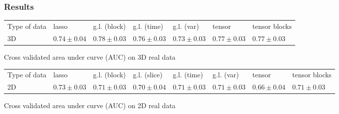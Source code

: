 \documentclass{beamer}
\begin{document}
\begin{frame}
    \frametitle{Results}
    \begin{table}[H]
        \centering
        \label{tab:result_real}
        \renewcommand{\arraystretch}{1.2} 
        \begin{adjustbox}{center}
        \begin{tabular}{|>{\centering\arraybackslash}m{1.4cm}|>{\centering\arraybackslash}m{1.1cm}|>{\centering\arraybackslash}m{1.1cm}|>{\centering\arraybackslash}m{1.1cm}|>{\centering\arraybackslash}m{1.1cm}|>{\centering\arraybackslash}m{1.1cm}|>{\centering\arraybackslash}m{1.1cm}|}
            \cline{1-7}
            Type of data & lasso & g.l. (block) & g.l. (time)& g.l. (var) & tensor & tensor blocks\\
            \cline{1-7} 
            3D & $0.74 \pm 0.04$& $0.78 \pm 0.03$ & $0.76 \pm 0.03$ & $0.73 \pm 0.03$ & $0.77 \pm 0.03$ & $0.77 \pm 0.03$ \\
            \cline{1-7}
    
        \end{tabular}
        
    \end{adjustbox}
    \parbox{0.9\textwidth}{
    \vspace{0.2 cm}    
    \centering \small Cross validated area under curve (AUC) on 3D real data}
    \vspace{0.3 cm}
    
    \begin{adjustbox}{center}
    \begin{tabular}{|>{\centering\arraybackslash}m{1.2cm}|>{\centering\arraybackslash}m{1cm}|>{\centering\arraybackslash}m{1cm}|>{\centering\arraybackslash}m{1cm}|>{\centering\arraybackslash}m{1cm}|>{\centering\arraybackslash}m{1cm}|>{\centering\arraybackslash}m{1cm}|>{\centering\arraybackslash}m{1cm}|}
        \cline{1-8}
        Type of data & lasso & g.l. (block) & g.l. (slice)& g.l. (time)& g.l. (var) & tensor & tensor blocks\\
        \cline{1-8} 
        2D & $0.73 \pm 0.03$ & $0.71 \pm 0.03$ & $0.70 \pm 0.04$ & $0.71 \pm 0.03 $  & $0.71 \pm 0.03$ & $0.66 \pm 0.04$ & $0.71 \pm 0.03$ \\
        \cline{1-8}
    \end{tabular}
    \end{adjustbox}
    \parbox{0.9\textwidth}{
    \vspace{0.2 cm}    
    \centering \small Cross validated area under curve (AUC) on 2D real data}
    \end{table}
\end{frame}
\end{document}
